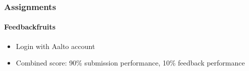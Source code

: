 \documentclass[english,t]{beamer}
\begin{document}
\begin{frame}
  \frametitle{Assignments}  %
  \framesubtitle{Feedbackfruits}

  \begin{itemize}
  \item Login with Aalto account
  \item Combined score: 90\% submission performance, 10\% feedback performance
  \end{itemize}
  
\end{frame}

  
\end{document}
